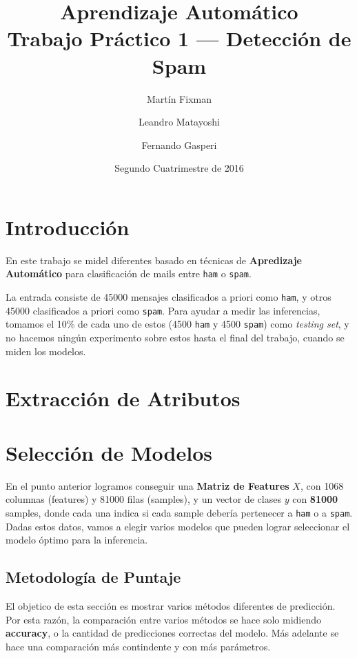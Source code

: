 \documentclass{article}
\title{Aprendizaje Automático \\ Trabajo Práctico 1 --- Detección de Spam}
\author{Martín Fixman \and Leandro Matayoshi \and Fernando Gasperi}
\date{Segundo Cuatrimestre de 2016}
\newcommand{\ham}{\large{\texttt{ham}}}
\newcommand{\spam}{\large{\texttt{spam}}}
\begin{document}
\maketitle

\newpage

\section{Introducción}

En este trabajo se midel diferentes basado en técnicas de \textbf{Apredizaje Automático} para clasificación de mails entre \ham{} o \spam{}.

La entrada consiste de \num{45000} mensajes clasificados a priori como \ham{}, y otros \num{45000} clasificados a priori como \spam{}. Para ayudar a medir las inferencias, tomamos el 10\% de cada uno de estos (\num{4500} \ham{} y \num{4500} \spam{}) como \textit{testing set}, y no hacemos ningún experimento sobre estos hasta el final del trabajo, cuando se miden los modelos.

\section{Extracción de Atributos}



\section{Selección de Modelos}

En el punto anterior logramos conseguir una \textbf{Matriz de Features} \( X \), con \num{1068} columnas (features) y \num{81000} filas (samples), y un vector de clases \( y \) con \textbf{81000} samples, donde cada una indica si cada sample debería pertenecer a \ham{} o a \spam{}. Dadas estos datos, vamos a elegir varios modelos que pueden lograr seleccionar el modelo óptimo para la inferencia.

\subsection{Metodología de Puntaje}

El objetico de esta sección es mostrar varios métodos diferentes de predicción. Por esta razón, la comparación entre varios métodos se hace solo midiendo \textbf{accuracy}, o la cantidad de predicciones correctas del modelo. Más adelante se hace una comparación más contindente y con más parámetros.
\end{document}
